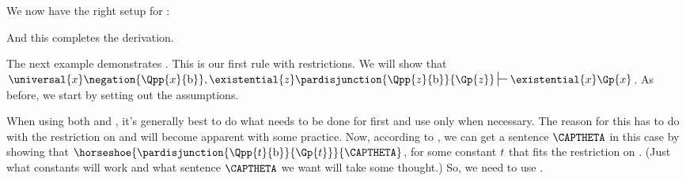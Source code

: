 We now have the right setup for :
\begin{gproof}[\label{GQDExampleG}]
\end{gproof}
And this completes the derivation. 

The next example demonstrates . 
This is our first rule with restrictions.
We will show that $\universal{\variable{x}}\negation{\Qpp{\variable{x}}{\constant{b}}},\existential{\variable{z}}\pardisjunction{\Qpp{\variable{z}}{\constant{b}}}{\Gp{\variable{z}}}\sststile{}{}\existential{\variable{x}}\Gp{\variable{x}}$.
As before, we start by setting out the assumptions. 
\begin{gproof}[\label{GQDExampleH}]
\end{gproof}
When using both  and , it's generally best to do what needs to be done for  first and use  only when necessary.
The reason for this has to do with the restriction on  and will become apparent with some practice. 
Now, according to , we can get a sentence $\CAPTHETA$ in this case by showing that $\horseshoe{\pardisjunction{\Qpp{\variable{t}}{\constant{b}}}{\Gp{\variable{t}}}}{\CAPTHETA}$, for some constant $t$ that fits the restriction on .
(Just what constants will work and what sentence $\CAPTHETA$ we want will take some thought.)
So, we need to use . 
\begin{gproof}[\label{GQDExampleI}]
\end{gproof}
